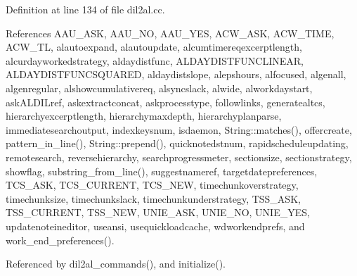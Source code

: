 Definition at line 134 of file dil2al.cc.

References AAU\_\-ASK, AAU\_\-NO, AAU\_\-YES, ACW\_\-ASK, ACW\_\-TIME, ACW\_\-TL, alautoexpand, alautoupdate, alcumtimereqexcerptlength, alcurdayworkedstrategy, aldaydistfunc, ALDAYDISTFUNCLINEAR, ALDAYDISTFUNCSQUARED, aldaydistslope, alepshours, alfocused, algenall, algenregular, alshowcumulativereq, alsyncslack, alwide, alworkdaystart, ask\-ALDILref, askextractconcat, askprocesstype, followlinks, generatealtcs, hierarchyexcerptlength, hierarchymaxdepth, hierarchyplanparse, immediatesearchoutput, indexkeysnum, isdaemon, String::matches(), offercreate, pattern\_\-in\_\-line(), String::prepend(), quicknotedstnum, rapidscheduleupdating, remotesearch, reversehierarchy, searchprogressmeter, sectionsize, sectionstrategy, showflag, substring\_\-from\_\-line(), suggestnameref, targetdatepreferences, TCS\_\-ASK, TCS\_\-CURRENT, TCS\_\-NEW, timechunkoverstrategy, timechunksize, timechunkslack, timechunkunderstrategy, TSS\_\-ASK, TSS\_\-CURRENT, TSS\_\-NEW, UNIE\_\-ASK, UNIE\_\-NO, UNIE\_\-YES, updatenoteineditor, useansi, usequickloadcache, wdworkendprefs, and work\_\-end\_\-preferences().

Referenced by dil2al\_\-commands(), and initialize().



